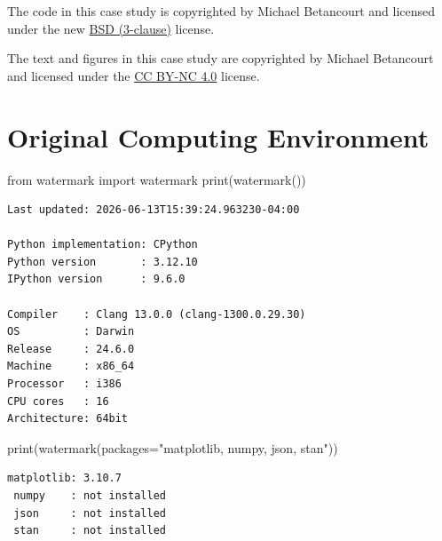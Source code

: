 \documentclass[
  letterpaper,
  DIV=11,
  numbers=noendperiod]{scrartcl}
\newenvironment{Shaded}{\begin{snugshade}}{\end{snugshade}}
\newcommand{\BuiltInTok}[1]{\textcolor[rgb]{0.00,0.23,0.31}{#1}}
\newcommand{\ImportTok}[1]{\textcolor[rgb]{0.00,0.46,0.62}{#1}}
\newcommand{\NormalTok}[1]{\textcolor[rgb]{0.00,0.23,0.31}{#1}}
\newcommand{\OperatorTok}[1]{\textcolor[rgb]{0.37,0.37,0.37}{#1}}
\newcommand{\StringTok}[1]{\textcolor[rgb]{0.13,0.47,0.30}{#1}}
\begin{document}
The code in this case study is copyrighted by Michael Betancourt and
licensed under the new
\href{https://opensource.org/licenses/BSD-3-Clause}{BSD (3-clause)}
license.

The text and figures in this case study are copyrighted by Michael
Betancourt and licensed under the
\href{https://creativecommons.org/licenses/by-nc/4.0/}{CC BY-NC 4.0}
license.

\section*{Original Computing
Environment}\label{original-computing-environment}

\begin{Shaded}
\begin{Highlighting}[]
\ImportTok{from}\NormalTok{ watermark }\ImportTok{import}\NormalTok{ watermark}
\BuiltInTok{print}\NormalTok{(watermark())}
\end{Highlighting}
\end{Shaded}

\begin{verbatim}
Last updated: 2026-06-13T15:39:24.963230-04:00

Python implementation: CPython
Python version       : 3.12.10
IPython version      : 9.6.0

Compiler    : Clang 13.0.0 (clang-1300.0.29.30)
OS          : Darwin
Release     : 24.6.0
Machine     : x86_64
Processor   : i386
CPU cores   : 16
Architecture: 64bit
\end{verbatim}

\begin{Shaded}
\begin{Highlighting}[]
\BuiltInTok{print}\NormalTok{(watermark(packages}\OperatorTok{=}\StringTok{"matplotlib, numpy, json, stan"}\NormalTok{))}
\end{Highlighting}
\end{Shaded}

\begin{verbatim}
matplotlib: 3.10.7
 numpy    : not installed
 json     : not installed
 stan     : not installed
\end{verbatim}
\end{document}
